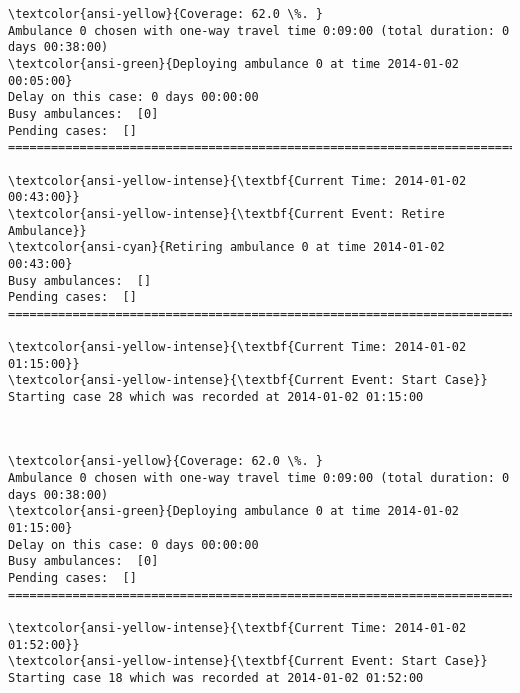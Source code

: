 \documentclass[11pt]{article}
\begin{document}
    \begin{Verbatim}[commandchars=\\\{\}]
\textcolor{ansi-yellow}{Coverage: 62.0 \%. }
Ambulance 0 chosen with one-way travel time 0:09:00 (total duration: 0 days 00:38:00)
\textcolor{ansi-green}{Deploying ambulance 0 at time 2014-01-02 00:05:00}
Delay on this case: 0 days 00:00:00
Busy ambulances:  [0]
Pending cases:  []
========================================================================

\textcolor{ansi-yellow-intense}{\textbf{Current Time: 2014-01-02 00:43:00}}
\textcolor{ansi-yellow-intense}{\textbf{Current Event: Retire Ambulance}}
\textcolor{ansi-cyan}{Retiring ambulance 0 at time 2014-01-02 00:43:00}
Busy ambulances:  []
Pending cases:  []
========================================================================

\textcolor{ansi-yellow-intense}{\textbf{Current Time: 2014-01-02 01:15:00}}
\textcolor{ansi-yellow-intense}{\textbf{Current Event: Start Case}}
Starting case 28 which was recorded at 2014-01-02 01:15:00

    \end{Verbatim}

    \begin{center}
    \end{center}
    { \hspace*{\fill} \\}
    
    \begin{Verbatim}[commandchars=\\\{\}]
\textcolor{ansi-yellow}{Coverage: 62.0 \%. }
Ambulance 0 chosen with one-way travel time 0:09:00 (total duration: 0 days 00:38:00)
\textcolor{ansi-green}{Deploying ambulance 0 at time 2014-01-02 01:15:00}
Delay on this case: 0 days 00:00:00
Busy ambulances:  [0]
Pending cases:  []
========================================================================

\textcolor{ansi-yellow-intense}{\textbf{Current Time: 2014-01-02 01:52:00}}
\textcolor{ansi-yellow-intense}{\textbf{Current Event: Start Case}}
Starting case 18 which was recorded at 2014-01-02 01:52:00

    \end{Verbatim}

    \begin{center}
    \end{center}
    { \hspace*{\fill} \\}
    
\end{document}
